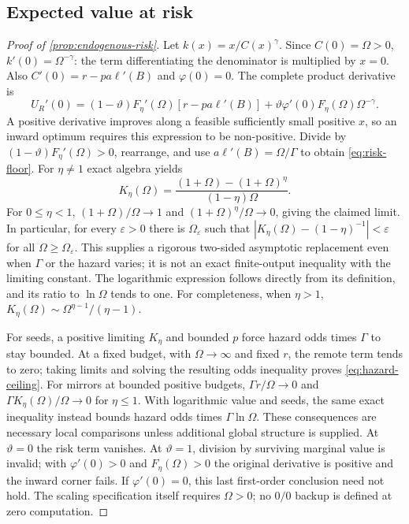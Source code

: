 \subsection{Expected value at risk}
\label{app:risk-proof}
\begin{proof}[Proof of \cref{prop:endogenous-risk}]
Let $k(x)=x/C(x)^\gamma$. Since $C(0)=\Omega>0$,
$k'(0)=\Omega^{-\gamma}$: the term differentiating the denominator is
multiplied by $x=0$. Also $C'(0)=r-pa\ell'(B)$ and
$\varphi(0)=0$. The complete product derivative is
\[
 U_R'(0)=(1-\vartheta)F_\eta'(\Omega)[r-pa\ell'(B)]
   +\vartheta\varphi'(0)F_\eta(\Omega)\Omega^{-\gamma}.
\]
A positive derivative improves along a feasible sufficiently small
positive $x$, so an inward optimum requires this expression to be
non-positive. Divide by $(1-\vartheta)F_\eta'(\Omega)>0$, rearrange,
and use $a\ell'(B)=\Omega/\Gamma$ to obtain \cref{eq:risk-floor}.
For $\eta\ne1$ exact algebra yields
\[
 K_\eta(\Omega)=
 \frac{(1+\Omega)-(1+\Omega)^\eta}{(1-\eta)\Omega}.
\]
For $0\leq\eta<1$, $(1+\Omega)/\Omega\to1$ and
$(1+\Omega)^\eta/\Omega\to0$, giving the claimed limit.
In particular, for every $\varepsilon>0$ there is $\Omega_\varepsilon$
such that
$|K_\eta(\Omega)-(1-\eta)^{-1}|<\varepsilon$ for all
$\Omega\geq\Omega_\varepsilon$. This supplies a rigorous two-sided
asymptotic replacement even when $\Gamma$ or the hazard varies; it is
not an exact finite-output inequality with the limiting constant.
The logarithmic expression follows directly from its definition, and
its ratio to $\ln\Omega$ tends to one. For completeness, when $\eta>1$,
$K_\eta(\Omega)\sim\Omega^{\eta-1}/(\eta-1)$.

For seeds, a positive limiting $K_\eta$ and bounded $p$ force hazard
odds times $\Gamma$ to stay bounded. At a fixed budget, with $\Omega\to
\infty$ and fixed $r$, the remote term tends to zero; taking limits
and solving the resulting odds inequality proves \cref{eq:hazard-ceiling}.
For mirrors at bounded positive budgets,
$\Gamma r/\Omega\to0$ and
$\Gamma K_\eta(\Omega)/\Omega\to0$ for $\eta\leq1$.
With logarithmic value and seeds, the same exact inequality instead
bounds hazard odds times $\Gamma\ln\Omega$. These consequences are
necessary local comparisons unless additional global structure is
supplied. At $\vartheta=0$ the risk term vanishes. At
$\vartheta=1$, division by surviving marginal value is invalid; with
$\varphi'(0)>0$ and $F_\eta(\Omega)>0$ the original derivative is
positive and the inward corner fails. If $\varphi'(0)=0$, this last
first-order conclusion need not hold. The scaling specification itself
requires $\Omega>0$; no $0/0$ backup is defined at zero computation.
\end{proof}

